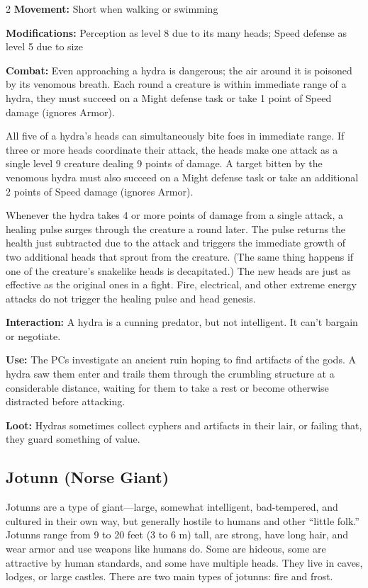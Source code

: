 \begin{multicols}{2}
\textbf{Movement:} Short when walking or swimming 

\textbf{Modifications:} Perception as level 8 due to its many heads; Speed defense as level 5 due to size 

\textbf{Combat:} Even approaching a hydra is dangerous; the air around it is poisoned by its venomous breath. Each round a creature is within immediate range of a hydra, they must succeed on a Might defense task or take 1 point of Speed damage (ignores Armor). 

All five of a hydra’s heads can simultaneously bite foes in immediate range. If three or more heads coordinate their attack, the heads make one attack as a single level 9 creature dealing 9 points of damage. A target bitten by the venomous hydra must also succeed on a Might defense task or take an additional 2 points of Speed damage (ignores Armor). 

Whenever the hydra takes 4 or more points of damage from a single attack, a healing pulse surges through the creature a round later. The pulse returns the health just subtracted due to the attack and triggers the immediate growth of two additional heads that sprout from the creature. (The same thing happens if one of the creature’s snakelike heads is decapitated.) The new heads are just as effective as the original ones in a fight. Fire, electrical, and other extreme energy attacks do not trigger the healing pulse and head genesis. 

\textbf{Interaction:} A hydra is a cunning predator, but not intelligent. It can’t bargain or negotiate. 

\textbf{Use:} The PCs investigate an ancient ruin hoping to find artifacts of the gods. A hydra saw them enter and trails them through the crumbling structure at a considerable distance, waiting for them to take a rest or become otherwise distracted before attacking.

\textbf{Loot:} Hydras sometimes collect cyphers and artifacts in their lair, or failing that, they guard something of value.

\subsection{Jotunn (Norse Giant)}

Jotunns are a type of giant—large, somewhat intelligent, bad-tempered, and cultured in their own way, but generally hostile to humans and other “little folk.” Jotunns range from 9 to 20 feet (3 to 6 m) tall, are strong, have long hair, and wear armor and use weapons like humans do. Some are hideous, some are attractive by human standards, and some have multiple heads. They live in caves, lodges, or large castles. There are two main types of jotunns: fire and frost.


\end{multicols}
